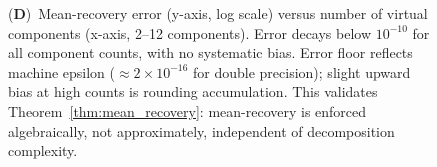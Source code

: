 \begin{figure}[!htbp]
{    (\textbf{D})~Mean-recovery error (y-axis, log scale) versus number of virtual components (x-axis, 2--12 components). Error decays below $10^{-10}$ for all component counts, with no systematic bias. Error floor reflects machine epsilon ($\approx 2 \times 10^{-16}$ for double precision); slight upward bias at high counts is rounding accumulation. This validates Theorem~\ref{thm:mean_recovery}: mean-recovery is enforced algebraically, not approximately, independent of decomposition complexity.}
    \label{fig:panel1_unified_signal}
\end{figure}


